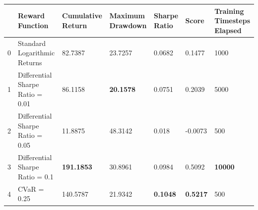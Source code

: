 \begin{tabular}{lllllll}
\toprule
 & Reward Function & Cumulative Return & Maximum Drawdown & Sharpe Ratio & Score & Training Timesteps Elapsed \\
\midrule
0 & Standard Logarithmic Returns & 82.7387 & 23.7257 & 0.0682 & 0.1477 & 1000 \\
1 & Differential Sharpe Ratio = 0.01 & 86.1158 & \textbf{20.1578} & 0.0751 & 0.2039 & 5000 \\
2 & Differential Sharpe Ratio = 0.05 & 11.8875 & 48.3142 & 0.018 & -0.0073 & 500 \\
3 & Differential Sharpe Ratio = 0.1 & \textbf{191.1853} & 30.8961 & 0.0984 & 0.5092 & \textbf{10000} \\
4 & CVaR = 0.25 & 140.5787 & 21.9342 & \textbf{0.1048} & \textbf{0.5217} & 500 \\
\bottomrule
\end{tabular}
